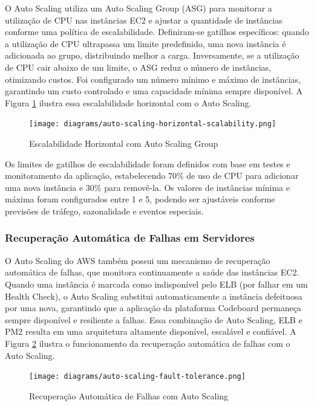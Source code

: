 O Auto Scaling utiliza um Auto Scaling Group (ASG) para monitorar a utilização de CPU nas instâncias EC2 e ajustar a quantidade de instâncias conforme uma política de escalabilidade. Definiram-se gatilhos específicos: quando a utilização de CPU ultrapassa um limite predefinido, uma nova instância é adicionada ao grupo, distribuindo melhor a carga. Inversamente, se a utilização de CPU cair abaixo de um limite, o ASG reduz o número de instâncias, otimizando custos. Foi configurado um número mínimo e máximo de instâncias, garantindo um custo controlado e uma capacidade mínima sempre disponível. A Figura \ref{fig:auto-scaling-horizontal-scalability} ilustra essa escalabilidade horizontal com o Auto Scaling.

\begin{figure}[H]
    \centering
    \texttt{[image: diagrams/auto-scaling-horizontal-scalability.png]}
    \caption{Escalabilidade Horizontal com Auto Scaling Group}
    \label{fig:auto-scaling-horizontal-scalability}
\end{figure}

Os limites de gatilhos de escalabilidade foram definidos com base em testes e monitoramento da aplicação, estabelecendo 70\% de uso de CPU para adicionar uma nova instância e 30\% para removê-la. Os valores de instâncias mínima e máxima foram configurados entre 1 e 5, podendo ser ajustáveis conforme previsões de tráfego, sazonalidade e eventos especiais.

\subsubsection{Recuperação Automática de Falhas em Servidores}

O Auto Scaling do AWS também possui um mecanismo de recuperação automática de falhas, que monitora continuamente a saúde das instâncias EC2. Quando uma instância é marcada como indisponível pelo ELB (por falhar em um Health Check), o Auto Scaling substitui automaticamente a instância defeituosa por uma nova, garantindo que a aplicação da plataforma Codeboard permaneça sempre disponível e resiliente a falhas. Essa combinação de Auto Scaling, ELB e PM2 resulta em uma arquitetura altamente disponível, escalável e confiável. A Figura \ref{fig:auto-scaling-fault-tolerance} ilustra o funcionamento da recuperação automática de falhas com o Auto Scaling.

\begin{figure}[H]
    \centering
    \texttt{[image: diagrams/auto-scaling-fault-tolerance.png]}
    \caption{Recuperação Automática de Falhas com Auto Scaling}
    \label{fig:auto-scaling-fault-tolerance}
\end{figure}

